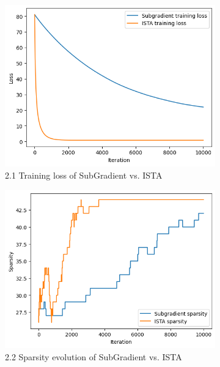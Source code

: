 \documentclass[11pt]{article}
\begin{document}
\begin{figure}[H]
    \centering
    \begin{subfigure}[t]{0.23\textwidth}
        \centering
        \includegraphics[width=\textwidth]{figures/fig1.png}
        \caption{2.1 Training loss of SubGradient vs. ISTA}
    \end{subfigure}
    \hfill
    \begin{subfigure}[t]{0.23\textwidth}
        \centering
        \includegraphics[width=\textwidth]{figures/fig2.png}
        \caption{2.2 Sparsity evolution of SubGradient vs. ISTA}
    \end{subfigure}
    \hfill
    \begin{subfigure}[t]{0.23\textwidth}

\end{subfigure}
\end{figure}
\end{document}
